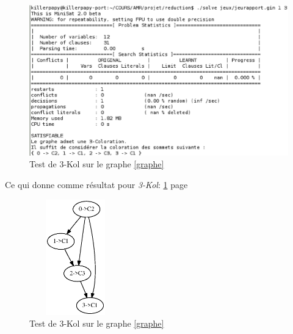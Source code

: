   \begin{figure}[!ht]
   \begin{center}
    \includegraphics[width=12cm]{images/3-Kol.eps}
    \caption{Test de 3-Kol sur le graphe \ref{graphe}}
   \end{center}
  \end{figure}
  
  Ce qui donne comme résultat pour \emph{3-Kol}: \ref{result} page \pageref{result}
  \begin{figure}[!ht]
   \begin{center}
    \includegraphics[width=4cm,height=5cm]{images/jeurapport.ps}
    \caption{Test de 3-Kol sur le graphe \ref{graphe} \label{result}}
   \end{center}
  \end{figure}
